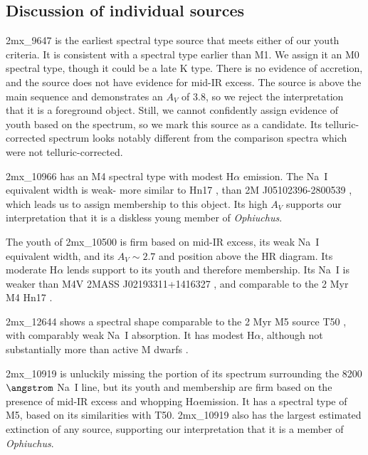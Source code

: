 \begin{landscape}
	
\end{landscape}

\subsection{Discussion of individual sources}
\label{sec_individual_sources}
2mx\_9647 is the earliest spectral type source that meets either of our youth criteria.  It is consistent with a spectral type earlier than M1.  We assign it an M0 spectral type, though it could be a late K type.  There is no evidence of accretion, and the source does not have evidence for mid-IR excess.  The source is above the main sequence and demonstrates an $A_V$ of 3.8, so we reject the interpretation that it is a foreground object.  Still, we cannot confidently assign evidence of youth based on the spectrum, so we mark this source as a candidate.  Its telluric-corrected spectrum looks notably different from the comparison spectra which were not telluric-corrected.  

2mx\_10966 has an M4 spectral type with modest H$\alpha$ emission.  The Na~I equivalent width is weak- more similar to Hn17 \citep{2004ApJ...602..816L}, than 2M J05102396-2800539 \citep{2007AJ....133..439C}, which leads us to assign membership to this object.  Its high $A_V$ supports our interpretation that it is a diskless young member of \emph{Ophiuchus}.

The youth of 2mx\_10500 is firm based on mid-IR excess, its weak Na~I equivalent width, and its $A_V\sim2.7$ and position above the HR diagram.  Its moderate H$\alpha$ lends support to its youth and therefore membership.  Its Na~I is weaker than M4V 2MASS J02193311+1416327 \citep{2003AJ....126.2421C}, and comparable to the 2 Myr M4 Hn17 \citep{2004ApJ...602..816L}.

2mx\_12644 shows a spectral shape comparable to the 2 Myr M5 source T50 \citep{2004ApJ...602..816L}, with comparably weak Na~I absorption.  It has modest H$\alpha$, although not substantially more than active M dwarfs \citep{2011AJ....141...97W}.  

2mx\_10919 is unluckily missing the portion of its spectrum surrounding the 8200 $\angstrom$ Na~I line, but its youth and membership are firm based on the presence of mid-IR excess and whopping H$\alpha$emission.  It has a spectral type of M5, based on its similarities with T50.  2mx\_10919 also has the largest estimated extinction of any source, supporting our interpretation that it is a member of \emph{Ophiuchus}.

